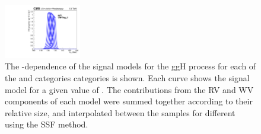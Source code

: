 \begin{figure}[ht!]
\includegraphics[width=0.3\textwidth]{modellingFigures/DCBpG/ggh_VBFTag_2_fmc_interp.pdf} 
\caption{The \mH-dependence of the signal models for the ggH process for each of the \Untagged and \VBFTag categories categories is shown. Each curve shows the signal model for a given value of \mH. The contributions from the RV and WV components of each model were summed together according to their relative size, and interpolated between the samples for different \mH using the SSF method.}

\label{fig:model:sig_interpolation}
\end{figure}

